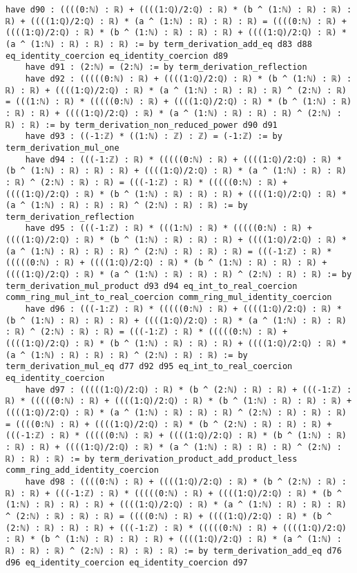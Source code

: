 \documentclass{article}
\begin{document}
\begin{tcolorbox}[colback=white!10, width=\linewidth]
\begin{lstlisting}[language=Lean4]
    have d90 : ((((0:ℕ) : ℝ) + ((((1:ℚ)/2:ℚ) : ℝ) * (b ^ (1:ℕ) : ℝ) : ℝ) : ℝ) + ((((1:ℚ)/2:ℚ) : ℝ) * (a ^ (1:ℕ) : ℝ) : ℝ) : ℝ) = ((((0:ℕ) : ℝ) + ((((1:ℚ)/2:ℚ) : ℝ) * (b ^ (1:ℕ) : ℝ) : ℝ) : ℝ) + ((((1:ℚ)/2:ℚ) : ℝ) * (a ^ (1:ℕ) : ℝ) : ℝ) : ℝ) := by term_derivation_add_eq d83 d88 eq_identity_coercion eq_identity_coercion d89
    have d91 : (2:ℕ) = (2:ℕ) := by term_derivation_reflection
    have d92 : (((((0:ℕ) : ℝ) + ((((1:ℚ)/2:ℚ) : ℝ) * (b ^ (1:ℕ) : ℝ) : ℝ) : ℝ) + ((((1:ℚ)/2:ℚ) : ℝ) * (a ^ (1:ℕ) : ℝ) : ℝ) : ℝ) ^ (2:ℕ) : ℝ) = (((1:ℕ) : ℝ) * (((((0:ℕ) : ℝ) + ((((1:ℚ)/2:ℚ) : ℝ) * (b ^ (1:ℕ) : ℝ) : ℝ) : ℝ) + ((((1:ℚ)/2:ℚ) : ℝ) * (a ^ (1:ℕ) : ℝ) : ℝ) : ℝ) ^ (2:ℕ) : ℝ) : ℝ) := by term_derivation_non_reduced_power d90 d91
    have d93 : ((-1:ℤ) * ((1:ℕ) : ℤ) : ℤ) = (-1:ℤ) := by term_derivation_mul_one
    have d94 : (((-1:ℤ) : ℝ) * (((((0:ℕ) : ℝ) + ((((1:ℚ)/2:ℚ) : ℝ) * (b ^ (1:ℕ) : ℝ) : ℝ) : ℝ) + ((((1:ℚ)/2:ℚ) : ℝ) * (a ^ (1:ℕ) : ℝ) : ℝ) : ℝ) ^ (2:ℕ) : ℝ) : ℝ) = (((-1:ℤ) : ℝ) * (((((0:ℕ) : ℝ) + ((((1:ℚ)/2:ℚ) : ℝ) * (b ^ (1:ℕ) : ℝ) : ℝ) : ℝ) + ((((1:ℚ)/2:ℚ) : ℝ) * (a ^ (1:ℕ) : ℝ) : ℝ) : ℝ) ^ (2:ℕ) : ℝ) : ℝ) := by term_derivation_reflection
    have d95 : (((-1:ℤ) : ℝ) * (((1:ℕ) : ℝ) * (((((0:ℕ) : ℝ) + ((((1:ℚ)/2:ℚ) : ℝ) * (b ^ (1:ℕ) : ℝ) : ℝ) : ℝ) + ((((1:ℚ)/2:ℚ) : ℝ) * (a ^ (1:ℕ) : ℝ) : ℝ) : ℝ) ^ (2:ℕ) : ℝ) : ℝ) : ℝ) = (((-1:ℤ) : ℝ) * (((((0:ℕ) : ℝ) + ((((1:ℚ)/2:ℚ) : ℝ) * (b ^ (1:ℕ) : ℝ) : ℝ) : ℝ) + ((((1:ℚ)/2:ℚ) : ℝ) * (a ^ (1:ℕ) : ℝ) : ℝ) : ℝ) ^ (2:ℕ) : ℝ) : ℝ) := by term_derivation_mul_product d93 d94 eq_int_to_real_coercion comm_ring_mul_int_to_real_coercion comm_ring_mul_identity_coercion
    have d96 : (((-1:ℤ) : ℝ) * (((((0:ℕ) : ℝ) + ((((1:ℚ)/2:ℚ) : ℝ) * (b ^ (1:ℕ) : ℝ) : ℝ) : ℝ) + ((((1:ℚ)/2:ℚ) : ℝ) * (a ^ (1:ℕ) : ℝ) : ℝ) : ℝ) ^ (2:ℕ) : ℝ) : ℝ) = (((-1:ℤ) : ℝ) * (((((0:ℕ) : ℝ) + ((((1:ℚ)/2:ℚ) : ℝ) * (b ^ (1:ℕ) : ℝ) : ℝ) : ℝ) + ((((1:ℚ)/2:ℚ) : ℝ) * (a ^ (1:ℕ) : ℝ) : ℝ) : ℝ) ^ (2:ℕ) : ℝ) : ℝ) := by term_derivation_mul_eq d77 d92 d95 eq_int_to_real_coercion eq_identity_coercion
    have d97 : (((((1:ℚ)/2:ℚ) : ℝ) * (b ^ (2:ℕ) : ℝ) : ℝ) + (((-1:ℤ) : ℝ) * (((((0:ℕ) : ℝ) + ((((1:ℚ)/2:ℚ) : ℝ) * (b ^ (1:ℕ) : ℝ) : ℝ) : ℝ) + ((((1:ℚ)/2:ℚ) : ℝ) * (a ^ (1:ℕ) : ℝ) : ℝ) : ℝ) ^ (2:ℕ) : ℝ) : ℝ) : ℝ) = ((((0:ℕ) : ℝ) + ((((1:ℚ)/2:ℚ) : ℝ) * (b ^ (2:ℕ) : ℝ) : ℝ) : ℝ) + (((-1:ℤ) : ℝ) * (((((0:ℕ) : ℝ) + ((((1:ℚ)/2:ℚ) : ℝ) * (b ^ (1:ℕ) : ℝ) : ℝ) : ℝ) + ((((1:ℚ)/2:ℚ) : ℝ) * (a ^ (1:ℕ) : ℝ) : ℝ) : ℝ) ^ (2:ℕ) : ℝ) : ℝ) : ℝ) := by term_derivation_product_add_product_less comm_ring_add_identity_coercion
    have d98 : ((((0:ℕ) : ℝ) + ((((1:ℚ)/2:ℚ) : ℝ) * (b ^ (2:ℕ) : ℝ) : ℝ) : ℝ) + (((-1:ℤ) : ℝ) * (((((0:ℕ) : ℝ) + ((((1:ℚ)/2:ℚ) : ℝ) * (b ^ (1:ℕ) : ℝ) : ℝ) : ℝ) + ((((1:ℚ)/2:ℚ) : ℝ) * (a ^ (1:ℕ) : ℝ) : ℝ) : ℝ) ^ (2:ℕ) : ℝ) : ℝ) : ℝ) = ((((0:ℕ) : ℝ) + ((((1:ℚ)/2:ℚ) : ℝ) * (b ^ (2:ℕ) : ℝ) : ℝ) : ℝ) + (((-1:ℤ) : ℝ) * (((((0:ℕ) : ℝ) + ((((1:ℚ)/2:ℚ) : ℝ) * (b ^ (1:ℕ) : ℝ) : ℝ) : ℝ) + ((((1:ℚ)/2:ℚ) : ℝ) * (a ^ (1:ℕ) : ℝ) : ℝ) : ℝ) ^ (2:ℕ) : ℝ) : ℝ) : ℝ) := by term_derivation_add_eq d76 d96 eq_identity_coercion eq_identity_coercion d97

\end{lstlisting}
\end{tcolorbox}
\end{document}
